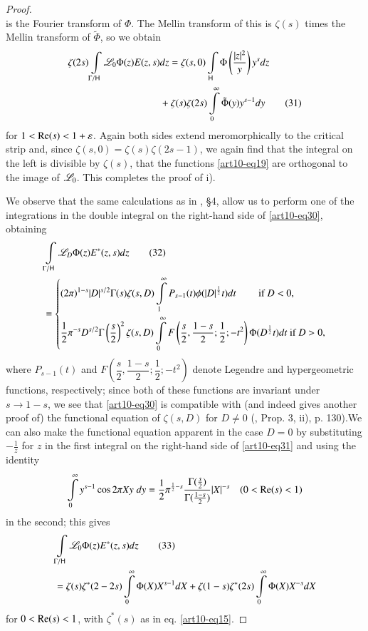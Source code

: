 \begin{proof}
$$$$
is the Fourier transform of $\Phi$. The Mellin transform of this is $\zeta(s)$ times the Mellin transform of $\tilde{\Phi}$, so we obtain 
\begin{align*}
\zeta (2s) \int\limits_{\Gamma / \mathsf{H}} \mathscr{L}_0 \Phi (z) E (z,s)& d z  = \zeta (s, 0) \int\limits_{\mathsf{H}} \Phi \left(\frac{|z|^2}{y} \right) y^s dz\\
& + \zeta(s) \zeta(2s) \int\limits^\infty_{0} \tilde{\Phi} (y) y^{s-1} dy \tag{31}\label{art10-eq31}
\end{align*}
for $1 < \operatorname{Re} (s) < 1+ \varepsilon$. Again both sides extend meromorphically to the critical strip and, since $\zeta(s,0) = \zeta (s) \zeta (2s-1)$, we again find that the integral on the left is divisible by $\zeta(s)$, \ie that the functions \eqref{art10-eq19} are orthogonal to the image of $\mathscr{L}_0$. This completes the proof of i).

We observe that the same calculations as in \cite{art10-12}, \S 4, allow us to perform one of the integrations in the double integral on the right-hand side of \eqref{art10-eq30}, obtaining 
\begin{align*}
& \int\limits_{\Gamma/ \mathsf{H}} \mathscr{L}_D \Phi (z) E^\ast (z,s) dz \tag{32}\label{art10-eq32}\\
& = \left\{
\begin{aligned}
& (2\pi)^{1-s} |D|^{s/2} \Gamma (s) \zeta (s, D) \int\limits^\infty_1 P_{s-1} (t) \phi (|D|^{\frac{1}{2}} t) dt \qquad \text{ if } D < 0, \\
& \frac{1}{2} \pi^{-s} D^{s/2} \Gamma \left(\frac{s}{2} \right)^2 \zeta (s,D) \int\limits^\infty_0 F \left(\frac{s}{2}, \frac{1-s}{2}; \frac{1}{2}; -t^2 \right) \Phi (D^{\frac{1}{2}} t) dt ~ \text{if } D > 0, 
\end{aligned}
\right.
\end{align*}
where $P_{s-1} (t)$ and $F \left(\dfrac{s}{2}, \dfrac{1-s}{2}; \dfrac{1}{2}; - t^2 \right)$ denote Legendre and hypergeometric functions, respectively; since both of these functions are invariant under $s \to 1 - s$, we see that \eqref{art10-eq30} is compatible with (and indeed gives another proof of) the functional equation of $\zeta (s, D)$ for $D \neq 0$ (\cite{art10-11}, Prop. 3, ii), p. 130).\pageoriginale We can also make the functional equation apparent in the case $D = 0$ by substituting $-\frac{1}{z}$ for $z$ in the first integral on the right-hand side of \eqref{art10-eq31} and using the identity
$$
\int\limits^\infty_{0} y^{s-1} \cos 2 \pi X y \; dy = \frac{1}{2} \pi^{\frac{1}{2} -s} \frac{\Gamma (\frac{s}{2})}{\Gamma (\frac{1-s}{2})} |X|^{-s} \quad (0 < \operatorname{Re} (s) < 1)
$$
in the second; this gives 
\begin{align*}
& \int\limits_{\Gamma / \mathsf{H}} \mathscr{L}_0 \Phi (z) E^{\ast} (z,s) dz \tag{33}\label{art10-eq33}\\
& = \zeta (s) \zeta^\ast (2 - 2 s) \int\limits^\infty_{0} \Phi (X) X^{s-1} dX + \zeta (1-s) \zeta^{\ast} (2s) \int\limits^\infty_{0} \Phi (X) X^{-s} d X
\end{align*}
for $0 < \operatorname{Re} (s) <1$, with $\zeta^\ast (s)$ as in eq. \eqref{art10-eq15}.


\end{proof}
